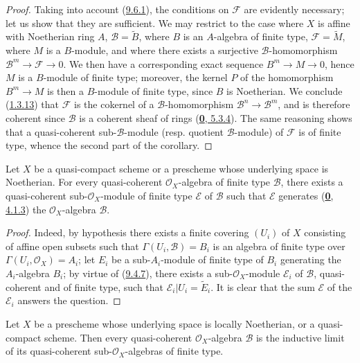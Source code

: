 \begin{proof}
Taking into account (\hyperref[I.9.6.1]{9.6.1}), the conditions on
$\mathscr{F}$ are evidently necessary; let us show that they are
sufficient. We may restrict to the case where $X$ is affine with Noetherian
ring $A$, $\mathscr{B}=\widetilde{B}$, where $B$ is an $A$-algebra of
finite type, $\mathscr{F}=\widetilde{M}$, where $M$ is a $B$-module, and
where there exists a surjective $\mathscr{B}$-homomorphism
$\mathscr{B}^m\to\mathscr{F}\to 0$. We then have a corresponding exact
sequence $B^m\to M\to 0$, hence $M$ is a $B$-module of finite type;
moreover, the kernel $P$ of the homomorphism $B^m\to M$ is then a
$B$-module of finite type, since $B$ is Noetherian. We conclude
(\hyperref[I.1.3.13]{1.3.13}) that $\mathscr{F}$ is the cokernel of a
$\mathscr{B}$-homomorphism $\mathscr{B}^n\to\mathscr{B}^m$, and is therefore
coherent since $\mathscr{B}$ is a coherent sheaf of rings
(\hyperref[0.5.3.4]{\textbf{0}, 5.3.4}). The same reasoning shows that a
quasi-coherent sub-$\mathscr{B}$-module (resp. quotient $\mathscr{B}$-module)
of $\mathscr{F}$ is of finite type, whence the second part of the
corollary.
\end{proof}

\begin{proposition}[9.6.5]
\label{I.9.6.5}
Let $X$ be a quasi-compact scheme or a prescheme whose underlying space
is Noetherian. For every quasi-coherent $\mathscr{O}_X$-algebra of finite
type $\mathscr{B}$, there exists a quasi-coherent sub-$\mathscr{O}_X$-module
of finite type $\mathscr{E}$ of $\mathscr{B}$ such that $\mathscr{E}$
generates \textup{(\hyperref[0.4.1.3]{\textbf{0}, 4.1.3})} the $\mathscr{O}_X$-algebra
$\mathscr{B}$.
\end{proposition}

\begin{proof}
Indeed, by hypothesis there exists a finite covering $(U_i)$ of $X$
consisting of affine open subsets such that $\Gamma(U_i,\mathscr{B})=B_i$ is
an algebra of finite type over $\Gamma(U_i,\mathscr{O}_X)=A_i$; let $E_i$ be
a sub-$A_i$-module of finite type of $B_i$ generating the $A_i$-algebra
$B_i$; by virtue of (\hyperref[I.9.4.7]{9.4.7}), there exists a
sub-$\mathscr{O}_X$-module $\mathscr{E}_i$ of $\mathscr{B}$,
quasi-coherent and of finite type, such that
$\mathscr{E}_i|U_i=\widetilde{E}_i$. It is clear that the sum
$\mathscr{E}$ of the $\mathscr{E}_i$ answers the question.
\end{proof}

\begin{proposition}[9.6.6]
\label{I.9.6.6}
Let $X$ be a prescheme whose underlying space is locally Noetherian,
or a quasi-compact scheme. Then every quasi-coherent $\mathscr{O}_X$-algebra
$\mathscr{B}$ is the inductive limit of its quasi-coherent
sub-$\mathscr{O}_X$-algebras of finite type.
\end{proposition}

